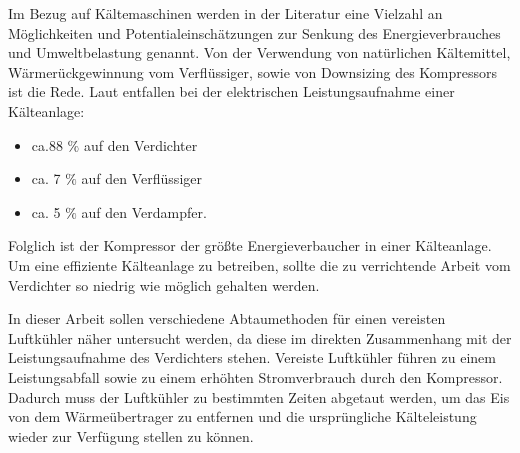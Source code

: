 Im Bezug auf Kältemaschinen werden in der Literatur eine Vielzahl an Möglichkeiten und Potentialeinschätzungen zur Senkung des Energieverbrauches und Umweltbelastung genannt. Von der Verwendung von natürlichen Kältemittel, Wärmerückgewinnung vom Verflüssiger, sowie von Downsizing des Kompressors ist die Rede. Laut \citep{EnergieAgenturNRW2010} entfallen bei der elektrischen Leistungsaufnahme einer Kälteanlage:

\begin{itemize}
	\item ca.88 $\%$ auf den Verdichter
	\item ca. 7 $\%$ auf den Verflüssiger
	\item ca. 5 $\%$ auf den Verdampfer.
\end{itemize}

Folglich ist der Kompressor der größte Energieverbaucher in einer Kälteanlage. Um eine effiziente Kälteanlage zu betreiben, sollte die zu verrichtende Arbeit vom Verdichter so niedrig wie möglich gehalten werden.

In dieser Arbeit sollen verschiedene Abtaumethoden für einen vereisten Luftkühler näher untersucht werden, da diese im direkten Zusammenhang mit der Leistungsaufnahme des Verdichters stehen. Vereiste Luftkühler führen zu einem Leistungsabfall sowie zu einem erhöhten Stromverbrauch durch den Kompressor. Dadurch muss der Luftkühler zu bestimmten Zeiten abgetaut werden, um das Eis von dem Wärmeübertrager zu entfernen und die ursprüngliche Kälteleistung wieder zur Verfügung stellen zu können. 



